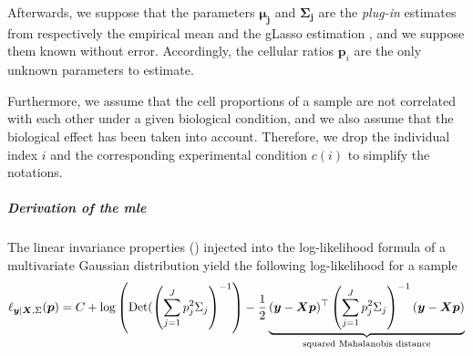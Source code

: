 Afterwards, we suppose that the parameters $\boldsymbol{\mu_j}$ and $\boldsymbol{\Sigma_j}$ are the \textit{plug-in} estimates from respectively the empirical mean and the gLasso estimation , and we suppose them known without error. Accordingly, the cellular ratios $\boldsymbol{p}_i$ are the only unknown parameters to estimate.

Furthermore, we assume that the cell proportions of a sample are not correlated with each other under a given biological condition, and we also assume that the biological effect has been taken into account.  Therefore, we drop the individual index $i$ and the corresponding experimental condition $c(i)$ to simplify the notations.

\subparagraph{Derivation of the mle}

The linear invariance properties () injected into the log-likelihood formula of a multivariate Gaussian distribution  yield the following log-likelihood for a sample 
\begin{equation}
    \label{eq:12}
\ell_{\boldsymbol{y} | \boldsymbol{X}, \Sigma}(\boldsymbol{p})=C + \log\left(\operatorname*{Det}(\left(\sum_{j=1}^J p_{j}^2\Sigma_{j}\right)^{-1}\right) - \frac{1}{2} \underbrace{(\boldsymbol{y} - \boldsymbol{X} \boldsymbol{p})^\top \left(\sum_{j=1}^J p_{j}^2\Sigma_{j}\right)^{-1} (\boldsymbol{y} - \boldsymbol{X}\boldsymbol{p})}_{\text{squared Mahalanobis distance}}   
\end{equation}

